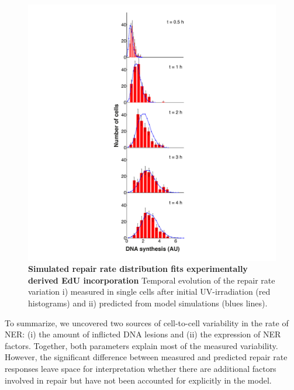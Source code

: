 \begin{figure}[htbp]
	\begin{center}
		\includegraphics[width=1\textwidth]{Abbildungen/figure3_7.pdf}
		\caption{\textbf{Simulated repair rate distribution fits experimentally derived EdU incorporation} Temporal evolution of the repair rate variation i)  measured in single cells after initial UV-irradiation (red histograms) and ii) predicted from model simulations (blues lines).}
		\label{fig:ModelData_tempVar}
	\end{center}
\end{figure}

To summarize, we uncovered two sources of cell-to-cell variability in the rate of NER: (i) the amount of inflicted DNA lesions and (ii) the expression of NER factors. Together, both parameters explain most of the measured variability. However, the significant difference between measured and predicted repair rate responses leave space for interpretation whether there are additional factors involved in repair but have not been accounted for explicitly in the model.     

